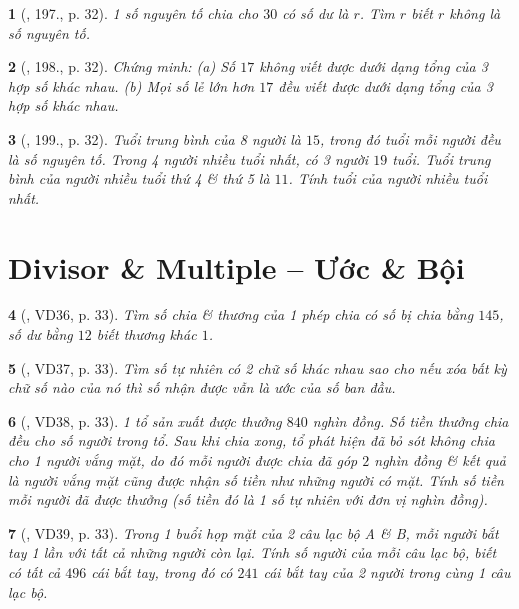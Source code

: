 \documentclass{article}
\newtheorem{baitoan}{}
\begin{document}
\begin{baitoan}[\cite{Binh_Toan_6_tap_1}, 197., p. 32]
	1 số nguyên tố chia cho $30$ có số dư là $r$. Tìm $r$ biết $r$ không là số nguyên tố.
\end{baitoan}

\begin{baitoan}[\cite{Binh_Toan_6_tap_1}, 198., p. 32]
	Chứng minh: (a) Số $17$ không viết được dưới dạng tổng của 3 hợp số khác nhau. (b) Mọi số lẻ lớn hơn $17$ đều viết được dưới dạng tổng của 3 hợp số khác nhau.
\end{baitoan}

\begin{baitoan}[\cite{Binh_Toan_6_tap_1}, 199., p. 32]
	Tuổi trung bình của 8 người là $15$, trong đó tuổi mỗi người đều là số nguyên tố. Trong 4 người nhiều tuổi nhất, có 3 người $19$ tuổi. Tuổi trung bình của người nhiều tuổi thứ 4 \& thứ 5 là $11$. Tính tuổi của người nhiều tuổi nhất.
\end{baitoan}


\section{Divisor \& Multiple -- Ước \& Bội}

\begin{baitoan}[\cite{Binh_Toan_6_tap_1}, VD36, p. 33]
	Tìm số chia \& thương của 1 phép chia có số bị chia bằng $145$, số dư bằng $12$ biết thương khác $1$.
\end{baitoan}

\begin{baitoan}[\cite{Binh_Toan_6_tap_1}, VD37, p. 33]
	Tìm số tự nhiên có 2 chữ số khác nhau sao cho nếu xóa bất kỳ chữ số nào của nó thì số nhận được vẫn là ước của số ban đầu.
\end{baitoan}

\begin{baitoan}[\cite{Binh_Toan_6_tap_1}, VD38, p. 33]
	1 tổ sản xuất được thưởng $840$ nghìn đồng. Số tiền thưởng chia đều cho số người trong tổ. Sau khi chia xong, tổ phát hiện đã bỏ sót không chia cho 1 người vắng mặt, do đó mỗi người được chia đã góp $2$ nghìn đồng \& kết quả là người vắng mặt cũng được nhận số tiền như những người có mặt. Tính số tiền mỗi người đã được thưởng (số tiền đó là 1 số tự nhiên với đơn vị nghìn đồng).
\end{baitoan}

\begin{baitoan}[\cite{Binh_Toan_6_tap_1}, VD39, p. 33]
	Trong 1 buổi họp mặt của 2 câu lạc bộ A \& B, mỗi người bắt tay 1 lần với tất cả những người còn lại. Tính số người của mỗi câu lạc bộ, biết có tất cả $496$ cái bắt tay, trong đó có $241$ cái bắt tay của 2 người trong cùng 1 câu lạc bộ.
\end{baitoan}
\end{document}
